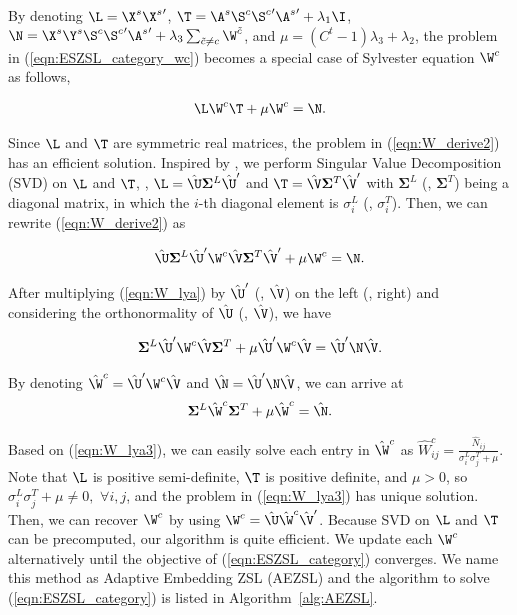 \documentclass[journal]{IEEEtran}
\begin{document}
\noindent By denoting $\L=\X^s{\X^s}'$, $\T=\A^s\S^c{\S^c}'{\A^s}'+\lambda_1\I$, $\N=\X^s\Y^s\S^c{\S^c}'{\A^s}'+\lambda_3\sum_{\tilde{c}\neq c}\W^{\tilde{c}}$, and $\mu =(C^t-1)\lambda_3+\lambda_2 $, the problem in (\ref{eqn:ESZSL_category_wc}) becomes a special case of Sylvester equation \wrt $\W^c$ as follows,

\vspace{-15pt}
\begin{eqnarray} \label{eqn:W_derive2}
\L\W^c\T +\mu\W^c= \N.
\end{eqnarray}

\noindent Since $\L$ and $\T$ are symmetric real matrices, the problem in (\ref{eqn:W_derive2}) has an efficient solution. Inspired by \cite{simoncini2016computational}, we perform Singular Value Decomposition (SVD) on $\L$ and $\T$, \ie, $\L=\hat{\U}\bm{\Sigma}^L\hat{\U}'$ and $\T=\hat{\V}\bm{\Sigma}^T\hat{\V}'$ with $\bm{\Sigma}^L$ (\resp, $\bm{\Sigma}^T$) being a diagonal matrix,  in which the $i$-th diagonal element is $\sigma^L_i$ (\resp, $\sigma^T_i$).  Then, we can rewrite (\ref{eqn:W_derive2}) as

\vspace{-15pt}
\begin{eqnarray} \label{eqn:W_lya}
\hat{\U}\bm{\Sigma}^L\hat{\U}'\W^c\hat{\V}\bm{\Sigma}^T\hat{\V}'+\mu\W^c=\N.
\end{eqnarray}

\noindent After multiplying (\ref{eqn:W_lya}) by $\hat{\U}'$ (\resp, $\hat{\V}$) on the left (\resp, right) and considering the orthonormality of $\hat{\U}$ (\resp, $\hat{\V}$), we have

\vspace{-15pt}
\begin{eqnarray}
\bm{\Sigma}^L\hat{\U}'\W^c\hat{\V}\bm{\Sigma}^T+
\mu\hat{\U}'\W^c\hat{\V}=\hat{\U}'\N\hat{\V}.
\end{eqnarray}

By denoting $\hat{\W}^c=\hat{\U}'\W^c\hat{\V}$ and $\hat{\N}=\hat{\U}'\N\hat{\V}$, we can arrive at
\begin{eqnarray} \label{eqn:W_lya3}
\bm{\Sigma}^L\hat{\W}^c\bm{\Sigma}^T+\mu\hat{\W}^c=\hat{\N}.
\end{eqnarray}

Based on (\ref{eqn:W_lya3}), we can easily solve each entry in $\hat{\W}^c$ as $\hat{W}^c_{ij}=\frac{\hat{N}_{ij}}{\sigma^L_i \sigma^T_j+\mu}$. Note that $\L$ is positive semi-definite, $\T$ is positive definite, and $\mu>0$, so $\sigma^L_i\sigma^T_j+\mu\neq 0,\,\,\forall i,j$, and the problem in (\ref{eqn:W_lya3}) has unique solution. Then, we can recover $\W^c$ by using $\W^c=\hat{\U}\hat{\W}^c\hat{\V}'$. Because SVD on $\L$ and $\T$ can be precomputed, our algorithm is quite efficient.
We update each $\W^c$ alternatively until the objective of (\ref{eqn:ESZSL_category}) converges. We name this method as Adaptive Embedding ZSL (AEZSL) and
the algorithm to solve (\ref{eqn:ESZSL_category}) is listed in Algorithm~\ref{alg:AEZSL}. 
\end{document}
